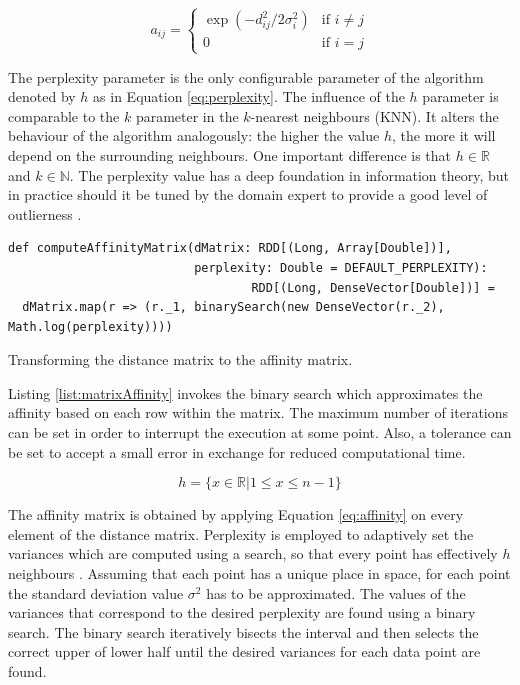 \begin{equation}
a_{ij} = \begin{cases} \exp(-d_{ij}^{2} / 2 \sigma_{i}^{2}) & \text{if } i \neq j\\ 0 & \text{if } i = j \end{cases}
\label{eq:affinity}
\end{equation}

The perplexity parameter is the only configurable parameter of the algorithm denoted by $h$ as in Equation \ref{eq:perplexity}. The influence of the $h$ parameter is comparable to the $k$ parameter in the $k$-nearest neighbours (KNN). It alters the behaviour of the algorithm analogously: the higher the value $h$, the more it will depend on the surrounding neighbours. One important difference is that $h \in \mathbb{R}$ and $k \in \mathbb{N}$. The perplexity value has a deep foundation in information theory, but in practice should it be tuned by the domain expert to provide a good level of outlierness \cite{MSU:CSE:00:2}.

\begin{listing}[ht!]
\begin{verbatim}
def computeAffinityMatrix(dMatrix: RDD[(Long, Array[Double])], 
                          perplexity: Double = DEFAULT_PERPLEXITY): 
                                  RDD[(Long, DenseVector[Double])] = 
  dMatrix.map(r => (r._1, binarySearch(new DenseVector(r._2), Math.log(perplexity))))
\end{verbatim}
               
\caption{Transforming the distance matrix to the affinity matrix.}
\label{list:matrixAffinity}
\end{listing}

Listing \ref{list:matrixAffinity} invokes the binary search which approximates the affinity based on each row within the matrix. The maximum number of iterations can be set in order to interrupt the execution at some point. Also, a tolerance can be set to accept a small error in exchange for reduced computational time.

\begin{equation}
h = \{x \in \mathbb{R} | 1 \leq x \leq n-1\}
\label{eq:perplexity}
\end{equation}



The affinity matrix is obtained by applying Equation \ref{eq:affinity} on every element of the distance matrix. Perplexity is employed to adaptively set the variances which are computed using a search, so that every point has effectively $h$ neighbours \cite{NIPS20022276}. Assuming that each point has a unique place in space, for each point the standard deviation value $\sigma^{2}$ has to be approximated. The values of the variances that correspond to the desired perplexity are found using a binary search. The binary search iteratively bisects the interval and then selects the correct upper of lower half until the desired variances for each data point are found.

